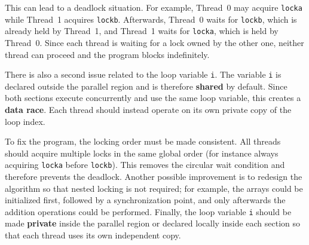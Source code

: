 \documentclass[unicode,10pt,a4paper,oneside,numbers=endperiod,openany]{scrartcl}
\begin{document}
This can lead to a deadlock situation. For example, Thread~0 may acquire \texttt{locka} while Thread~1 acquires \texttt{lockb}. Afterwards, Thread~0 waits for \texttt{lockb}, which is already held by Thread~1, and Thread~1 waits for \texttt{locka}, which is held by Thread~0. Since each thread is waiting for a lock owned by the other one, neither thread can proceed and the program blocks indefinitely.

There is also a second issue related to the loop variable \texttt{i}. The variable \texttt{i} is declared outside the parallel region and is therefore \textbf{shared} by default. Since both sections execute concurrently and use the same loop variable, this creates a \textbf{data race}. Each thread should instead operate on its own private copy of the loop index.

To fix the program, the locking order must be made consistent. All threads should acquire multiple locks in the same global order (for instance always acquiring \texttt{locka} before \texttt{lockb}). This removes the circular wait condition and therefore prevents the deadlock. Another possible improvement is to redesign the algorithm so that nested locking is not required; for example, the arrays could be initialized first, followed by a synchronization point, and only afterwards the addition operations could be performed. Finally, the loop variable \texttt{i} should be made \textbf{private} inside the parallel region or declared locally inside each section so that each thread uses its own independent copy.
\newpage
\end{document}
